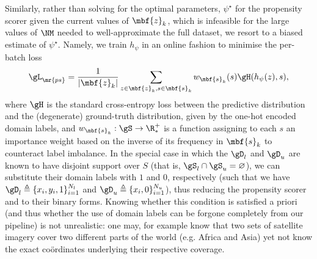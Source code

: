 Similarly, rather than solving for the optimal parameters, $\psi^\star$ for the propensity scorer
given the current values of $\mbf{z}_k$, which is infeasible for the large values of $\NM$ needed
to well-approximate the full dataset, we resort to a biased estimate of $\psi^\star$.
%
Namely, we train $h_\psi$ in an online fashion to minimise the per-batch loss 
\begin{equation}
\gL_\mr{ps} = \frac{1}{|\mbf{z}_k|} \sum_{ z \in \mbf{z}_k, s \in \mbf{s}_k } w_{\mbf{s}_k}(s) \gH(h_{\psi}(z), s), 
\end{equation}
where $\gH$ is the standard cross-entropy loss between the predictive distribution and the
(degenerate) ground-truth distribution, given by the one-hot encoded domain labels, and
$w_{\mbf{s}_k}: \gS \to \R^+_*$ is a function assigning to each $s$ an importance weight
\citep{shimodaira2000improving} based on the inverse of its frequency in $\mbf{s}_k$ to counteract label imbalance.
%
In the special case in which the $\gD_l$ and $\gD_u$ are known to have disjoint support over $S$
(that is, $\gS_l \cap \gS_u = \varnothing$), we can substitute their domain labels with $1$ and
$0$, respectively (such that we have $\gD_l \triangleq \{ x_i, y_i, 1 \}_{i=1}^{N_l}$ and $\gD_u
\triangleq \{x_i, 0 \}_{i=1}^{N_u}$), thus reducing the propensity scorer and \CNN{} to their binary
forms. 
%
Knowing whether this condition is satisfied a priori (and thus whether the use
of domain labels can be forgone completely from our pipeline) is not unrealistic: one may, for
example know that two sets of satellite imagery cover two different parts of the world (e.g. Africa
and Asia) yet not know the exact co{\"o}rdinates underlying their respective coverage.


